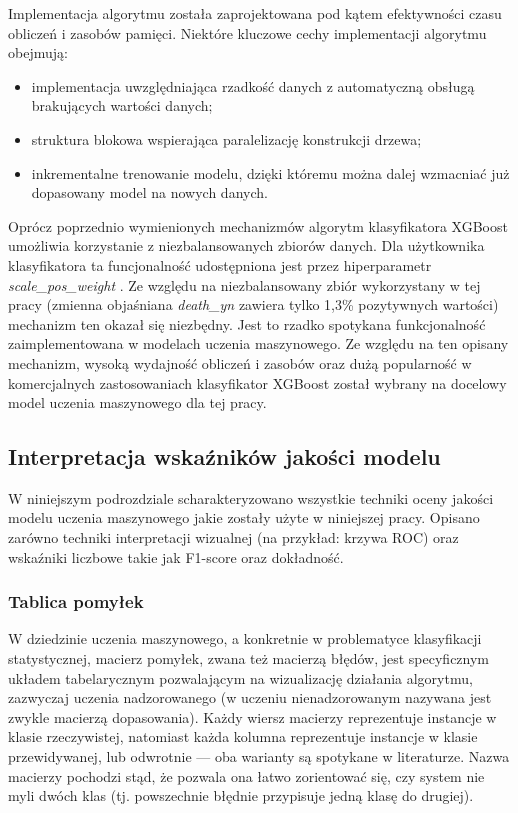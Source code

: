 \documentclass[polish, twoside, 12pt, a4paper]{article}
\theoremstyle{definition}
\theoremstyle{plain}
\theoremstyle{remark}
\begin{document}
Implementacja algorytmu została zaprojektowana pod kątem efektywności czasu obliczeń i zasobów pamięci. Niektóre kluczowe cechy implementacji algorytmu obejmują:
\begin{itemize}[noitemsep]
 \item implementacja uwzględniająca rzadkość danych z automatyczną obsługą brakujących wartości danych;
 \item struktura blokowa wspierająca paralelizację konstrukcji drzewa;
 \item inkrementalne trenowanie modelu, dzięki któremu można dalej wzmacniać już dopasowany model na nowych danych.
\end{itemize}

Oprócz poprzednio wymienionych mechanizmów algorytm klasyfikatora XGBoost umożliwia korzystanie z niezbalansowanych zbiorów danych. Dla użytkownika klasyfikatora ta funcjonalność udostępniona jest przez hiperparametr \emph{scale\_pos\_weight} \citep{chen2016}. Ze względu na niezbalansowany zbiór wykorzystany w tej pracy (zmienna objaśniana \emph{death\_yn} zawiera tylko 1,3\% pozytywnych wartości) mechanizm ten okazał się niezbędny. Jest to rzadko spotykana funkcjonalność zaimplementowana w modelach uczenia maszynowego. Ze względu na ten opisany mechanizm, wysoką wydajność obliczeń i zasobów oraz dużą popularność w komercjalnych zastosowaniach klasyfikator XGBoost został wybrany na docelowy model uczenia maszynowego dla tej pracy. 

\subsection{Interpretacja wskaźników jakości modelu}

W niniejszym podrozdziale scharakteryzowano wszystkie techniki oceny jakości modelu uczenia maszynowego jakie zostały użyte w niniejszej pracy. Opisano zarówno techniki interpretacji wizualnej (na przykład: krzywa ROC) oraz wskaźniki liczbowe takie jak F1-score oraz dokładność.


\subsubsection{Tablica pomyłek}

W dziedzinie uczenia maszynowego, a konkretnie w problematyce klasyfikacji statystycznej, macierz pomyłek, zwana też macierzą błędów, jest specyficznym układem tabelarycznym pozwalającym na wizualizację działania algorytmu, zazwyczaj uczenia nadzorowanego (w uczeniu nienadzorowanym nazywana jest zwykle macierzą dopasowania). Każdy wiersz macierzy reprezentuje instancje w klasie rzeczywistej, natomiast każda kolumna reprezentuje instancje w klasie przewidywanej, lub odwrotnie --- oba warianty są spotykane w literaturze. Nazwa macierzy pochodzi stąd, że pozwala ona łatwo zorientować się, czy system nie myli dwóch klas (tj. powszechnie błędnie przypisuje jedną klasę do drugiej).
\end{document}
